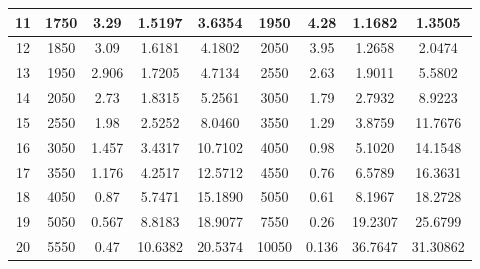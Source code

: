 \begin{table}[hptb]
\begin{tabular}{|c|c|c|c|c|c|c|c|c|}
        11 & 1750 & 3.29 & 1.5197 & 3.6354 & 1950 & 4.28 & 1.1682 & 1.3505 \\
        \hline
        12 & 1850 & 3.09 & 1.6181 & 4.1802 & 2050 & 3.95 & 1.2658 & 2.0474 \\
        \hline
        13 & 1950 & 2.906 & 1.7205 & 4.7134 & 2550 & 2.63 & 1.9011 & 5.5802 \\
        \hline
        14 & 2050 & 2.73 & 1.8315 & 5.2561 & 3050 & 1.79 & 2.7932 & 8.9223 \\
        \hline
        15 & 2550 & 1.98 & 2.5252 & 8.0460 & 3550 & 1.29 & 3.8759 & 11.7676 \\
        \hline
        16 & 3050 & 1.457 & 3.4317 & 10.7102 & 4050 & 0.98 & 5.1020 & 14.1548 \\
        \hline
        17 & 3550 & 1.176 & 4.2517 & 12.5712 & 4550 & 0.76 & 6.5789 & 16.3631 \\
        \hline
        18 & 4050 & 0.87 & 5.7471 & 15.1890 & 5050 & 0.61 & 8.1967 & 18.2728 \\
        \hline
        19 & 5050 & 0.567 & 8.8183 & 18.9077 & 7550 & 0.26 & 19.2307 & 25.6799 \\
        \hline
        20 & 5550 & 0.47 & 10.6382 & 20.5374 & 10050 & 0.136 & 36.7647 & 31.30862 \\
        \hline
        
\end{tabular}
\end{table}